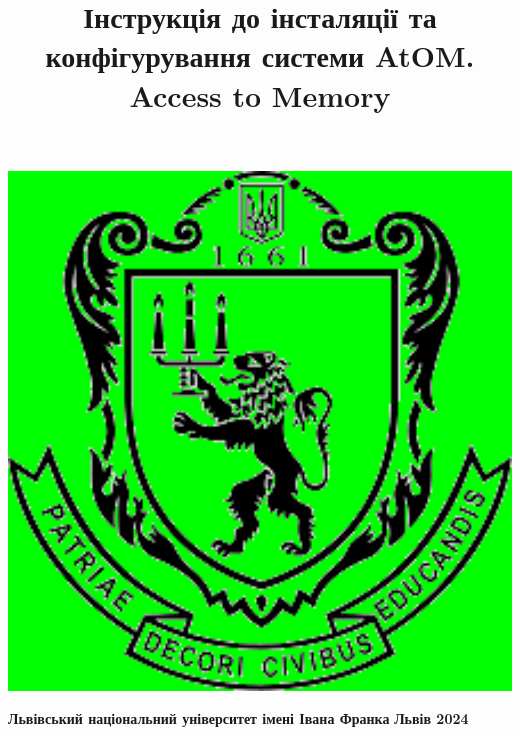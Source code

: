 \documentclass[14pt,a4paper]{article}
\title{\Huge \textbf{Інструкція до інсталяції та конфігурування системи AtOM. Access to Memory} }
\date{}
\begin{document}
\begin{titlepage}
    \pagecolor{green} 
    \color{black}
    \maketitle
    \thispagestyle{empty}
    
	\begin{center}
	\includegraphics[max width=1.5\textwidth]{Images/logo_grn.png}
	\end{center}    
    
    \vspace*{8cm}
    \center \textbf{Львівський національний університет імені Івана Франка}
    \center \textbf{Львів 2024}

\end{titlepage}

\pagecolor{white}
\color{black}

\newpage

\tableofcontents
\newpage
{}
\end{document}
